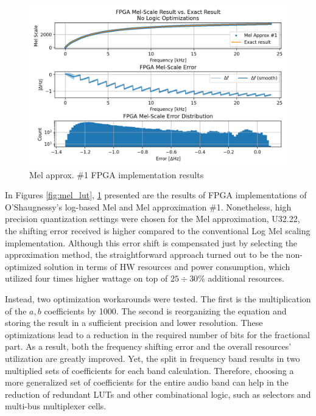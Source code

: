 \begin{figure}[H]
    \centering
    \includegraphics[width=\linewidth]{Scaling/images/mel_approx_no_opt}
    \caption{Mel approx. \#1 FPGA implementation results}\label{fig:mel_approx_no_opt}
\end{figure}

In Figures \ref{fig:mel_lut}, \ref{fig:mel_approx_no_opt} 
presented are the results of FPGA implementations
of O'Shaugnessy's log-based Mel and Mel approximation \#1.
Nonetheless, high precision quantization settings were chosen
for the Mel approximation, U32.22,  
the shifting error received is higher compared 
to the conventional Log Mel scaling implementation.
Although this error shift is compensated 
just by selecting the approximation method, 
the straightforward approach 
turned out to be the non-optimized solution 
in terms of HW resources and power consumption,
which utilized four times higher wattage on top of \(25 \div 30 \%\) 
additional resources.

Instead, two optimization workarounds were tested.
The first is the multiplication of the \(a, b\) coefficients
by 1000. 
The second is reorganizing the equation and storing the 
result in a sufficient precision and lower resolution.  
These optimizations lead to a reduction in the 
required number of bits for the fractional part.
As a result, both the frequency shifting error 
and the overall resources' utilization are greatly improved.
Yet, the split in frequency band results in two multiplied sets
of coefficients for each band calculation.
Therefore, choosing a more generalized set 
of coefficients for the entire audio band can help 
in the reduction of redundant LUTs and other combinational logic, 
such as selectors and multi-bus multiplexer cells.

